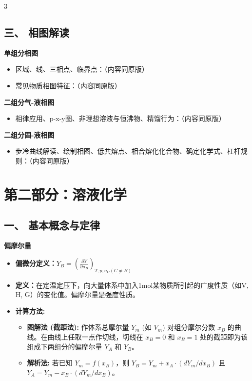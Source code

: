 \documentclass[a4paper,6pt]{article} %
\begin{document}
\begin{multicols}{3}
\subsection*{三、 相图解读}
\textbf{单组分相图}
\begin{itemize}
\item 区域、线、三相点、临界点：（内容同原版）
\item 常见物质相图特征：（内容同原版）
\end{itemize}
\textbf{二组分气-液相图}
\begin{itemize}
\item 相律应用、p-x-y图、非理想溶液与恒沸物、精馏行为：（内容同原版）
\end{itemize}
\textbf{二组分固-液相图}
\begin{itemize}
\item 步冷曲线解读、绘制相图、低共熔点、相合熔化化合物、确定化学式、杠杆规则：（内容同原版）
\end{itemize}

\section*{第二部分：溶液化学}
\subsection*{一、 基本概念与定律}
\textbf{偏摩尔量}
\begin{itemize}
    \item \textbf{偏微分定义：}$Y_B = \left(\frac{\partial Y}{\partial n_B}\right)_{T,p,n_C (C\neq B)}$
    \item \textbf{定义：}在定温定压下，向大量体系中加入1mol某物质所引起的广度性质（如V, H, G）的变化值。偏摩尔量是强度性质。
    \item \textbf{计算方法:}
    \begin{itemize}
        \item \textbf{图解法 (截距法):} 作体系总摩尔量 $Y_m$ (如 $V_m$) 对组分摩尔分数 $x_B$ 的曲线。在曲线上任取一点作切线，切线在 $x_B=0$ 和 $x_B=1$ 处的截距即为该组成下两组分的偏摩尔量 $Y_A$ 和 $Y_B$。
        \item \textbf{解析法:} 若已知 $Y_m = f(x_B)$，则 $Y_B = Y_m + x_A \cdot (dY_m/dx_B)$ 且 $Y_A = Y_m - x_B \cdot (dY_m/dx_B)$。
    \end{itemize}
\end{itemize}


\end{multicols}
\end{document}
